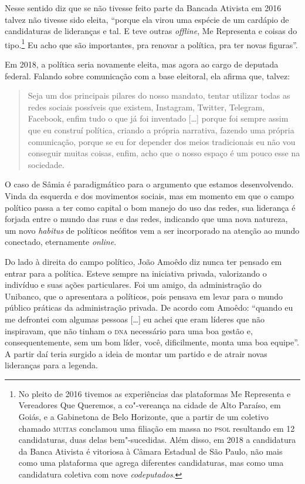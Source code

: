 Nesse sentido diz que se não tivesse feito parte da Bancada Ativista em
2016 talvez não tivesse sido eleita, ``porque ela virou uma espécie de
um cardápio de candidaturas de lideranças e tal. E teve outras \textit{offline},
Me Representa e coisas do tipo.\footnote{No pleito de 2016 tivemos as
  experiências das plataformas Me Representa e Vereadores Que Queremos,
  a co"-vereança na cidade de Alto Paraíso, em Goiás, e a Gabinetona de
  Belo Horizonte, que a partir de um coletivo chamado \textsc{muitas} conclamou
  uma filiação em massa no \textsc{psol} resultando em 12 candidaturas, duas
  delas bem"-sucedidas. Além disso, em 2018 a candidatura da Banca
  Ativista é vitoriosa à Câmara Estadual de São Paulo, não mais como uma
  plataforma que agrega diferentes candidaturas, mas como uma
  candidatura coletiva com nove \textit{codeputados}.} Eu acho que são importantes, pra renovar a
política, pra ter novas figuras''.


Em 2018, a política seria novamente eleita, mas agora ao cargo de
deputada federal. Falando sobre comunicação com a base eleitoral, ela
afirma que, talvez:

\begin{quote}
Seja um dos principais pilares do nosso mandato, tentar utilizar todas
as redes sociais possíveis que existem, Instagram, Twitter, Telegram,
Facebook, enfim tudo o que já foi inventado {[}\ldots{}{]} porque foi sempre
assim que eu construí política, criando a própria narrativa, fazendo uma
própria comunicação, porque se eu for depender dos meios tradicionais eu
não vou conseguir muitas coisas, enfim, acho que o nosso espaço é um
pouco esse na sociedade.
\end{quote}

O caso de Sâmia é paradigmático para o argumento que estamos
desenvolvendo. Vinda da esquerda e dos movimentos sociais, mas em
momento em que o campo político passa a ter como capital o bom manejo do
uso das redes, sua liderança é forjada entre o mundo das ruas e das
redes, indicando que uma nova natureza, um novo \textit{habitus} de
políticos neófitos vem a ser incorporado na atenção ao mundo conectado,
eternamente \textit{online}.

Do lado à direita do campo político, João Amoêdo diz nunca ter pensado
em entrar para a política. Esteve sempre na iniciativa privada,
valorizando o indivíduo e suas ações particulares. Foi um amigo, da
administração do Unibanco, que o apresentara a políticos, pois pensava
em levar para o mundo público práticas da administração privada. De
acordo com Amoêdo: ``quando eu me defrontei com algumas pessoas
{[}\ldots{}{]} eu achei que eram líderes que não inspiravam, que não tinham o
\textsc{dna} necessário para uma boa gestão e, consequentemente, sem um bom
líder, você, dificilmente, monta uma boa equipe''. A partir daí teria
surgido a ideia de montar um partido e de atrair novas lideranças para a
legenda.

